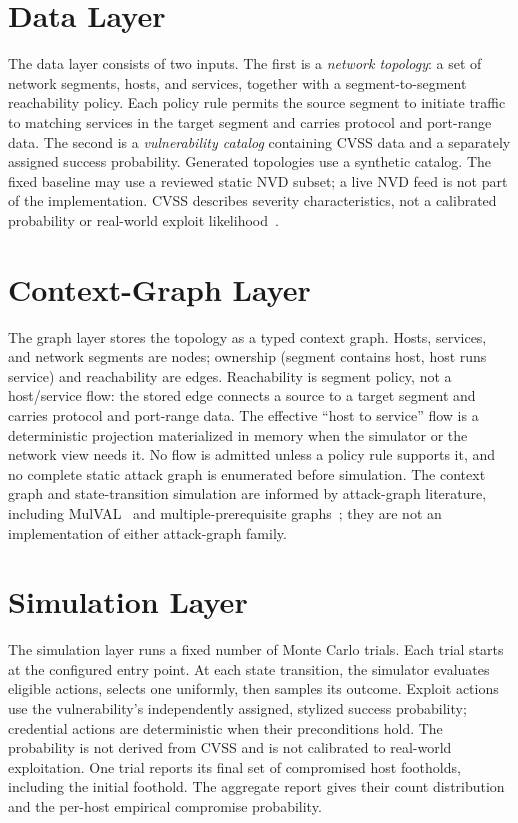 \section{Data Layer}
\label{ch:design:data}

The data layer consists of two inputs. The first is a \emph{network topology}: a set of network segments, hosts, and services, together with a segment-to-segment reachability policy. Each policy rule permits the source segment to initiate traffic to matching services in the target segment and carries protocol and port-range data. The second is a \emph{vulnerability catalog} containing CVSS data and a separately assigned success probability. Generated topologies use a synthetic catalog. The fixed baseline may use a reviewed static NVD subset; a live NVD feed is not part of the implementation. CVSS describes severity characteristics, not a calibrated probability or real-world exploit likelihood~\cite{nvd}.

\section{Context-Graph Layer}
\label{ch:design:graph}

The graph layer stores the topology as a typed context graph. Hosts, services, and network segments are nodes; ownership (segment contains host, host runs service) and reachability are edges. Reachability is segment policy, not a host/service flow: the stored edge connects a source to a target segment and carries protocol and port-range data. The effective \enquote{host to service} flow is a deterministic projection materialized in memory when the simulator or the network view needs it. No flow is admitted unless a policy rule supports it, and no complete static attack graph is enumerated before simulation. The context graph and state-transition simulation are informed by attack-graph literature, including MulVAL~\cite{ou05mulval} and multiple-prerequisite graphs~\cite{ingols06mpg}; they are not an implementation of either attack-graph family.

\section{Simulation Layer}
\label{ch:design:sim}

The simulation layer runs a fixed number of Monte Carlo trials. Each trial starts at the configured entry point. At each state transition, the simulator evaluates eligible actions, selects one uniformly, then samples its outcome. Exploit actions use the vulnerability's independently assigned, stylized success probability; credential actions are deterministic when their preconditions hold. The probability is not derived from CVSS and is not calibrated to real-world exploitation. One trial reports its final set of compromised host footholds, including the initial foothold. The aggregate report gives their count distribution and the per-host empirical compromise probability.

